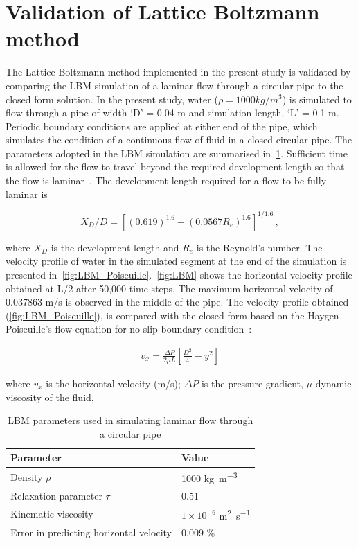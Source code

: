 
\section{Validation of Lattice Boltzmann method}

The Lattice Boltzmann method implemented in the present study is validated by 
comparing the LBM simulation of a laminar flow through a circular pipe to 
the closed form solution. In the present study, water ($\rho=1000 kg/m^{3}$) is 
simulated to flow through a pipe of width `D' = 0.04 m and 
simulation length, `L' = 0.1 m. Periodic boundary conditions are applied at 
either end of the pipe, which simulates the condition of a continuous flow of 
fluid in a closed circular pipe. The parameters adopted in the LBM simulation 
are summarised in~\cref{table:lbm}. Sufficient time is allowed for the flow to 
travel beyond the required development length so that the flow is 
laminar~\citet{Durst2005}. The development length required for a flow to 
be fully laminar is

\begin{equation}
X_{D}/D=[(0.619)^{1.6}+(0.0567 R_{e})^{1.6}]^{1/1.6} \,,
\end{equation}

\noindent where $X_{D}$ is the development length and $R_{e}$ is the Reynold's 
number. The velocity profile of water in the simulated segment at the end of 
the simulation is presented in~\cref{fig:LBM_Poiseuille}.~\cref{fig:LBM} shows 
the horizontal velocity profile obtained at L/2 after 50,000 time steps. The 
maximum horizontal velocity of 0.037863 m/s is observed in the middle of the 
pipe. The velocity profile obtained (\cref{fig:LBM_Poiseuille}), is compared 
with the closed-form based on the Haygen-Poiseuille's flow equation for no-slip 
boundary condition~\citep{Willis2008}:

\begin{align}
\mathit{v}_{\mathit{x}}=\frac{\Delta P}{2 \mu L} [\frac{D^{2}}{4}-y^{2}]
\end{align}

where $v_{x}$ is the horizontal velocity (m/s); $\Delta P$ is the pressure 
gradient, $\mu$ dynamic viscosity of the fluid, 

\begin{table}
\caption{LBM parameters used in simulating laminar flow through a circular pipe}
\label{table:lbm}
\centering
\begin{tabular}{ll}
\toprule
\textbf{Parameter} & \textbf{Value} \\ \midrule
Density $\rho$ & 1000 \si{\kilogram\per\metre\cubed}\\ 
Relaxation parameter $\tau$ & 0.51 \\ 
Kinematic viscosity  & $1 \times 10^{-6}$ \si{\metre\squared\per\second} \\ 
\midrule
Error in predicting horizontal velocity & 0.009 \% \\ \bottomrule
\end{tabular}
\end{table}

